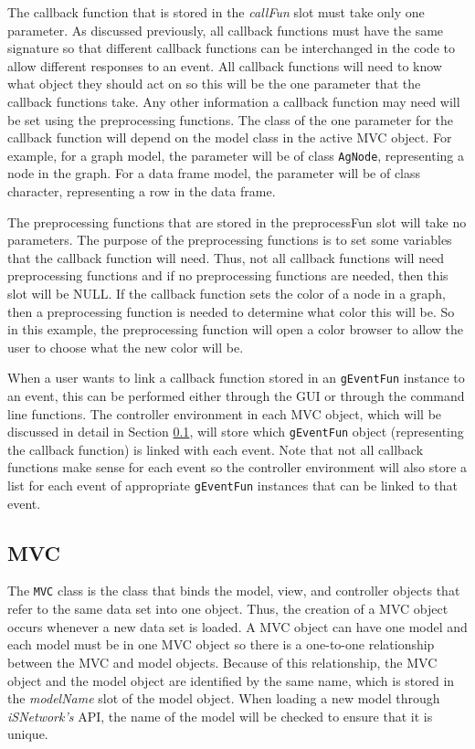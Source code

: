 \documentclass{article}[11pt]
\newcommand{\Robject}[1]{{\texttt{#1}}}
\newcommand{\Rpackage}[1]{{\textit{#1}}}
\newcommand{\Rslot}[1]{\textsl{#1}}
\begin{document}
The callback function that is stored in the \Rslot{callFun} slot must take
only one parameter.  As discussed previously, all callback functions must have
the same signature so that different callback functions can be interchanged in
the code to allow different responses to an event.  All callback functions
will need to know what object they should act on so this will be the one
parameter that the callback functions take.  Any other information a callback
function may need will be set using the preprocessing functions.  The class of
the one parameter for the callback function will depend on the model class in
the active MVC object.  For example, for a graph model, the parameter will be
of class \Robject{AgNode}, representing a node in the graph.  For a data frame
model, the parameter will be of class character, representing a row in the
data frame. 

The preprocessing functions that are stored in the preprocessFun slot will
take no parameters.  The purpose of the preprocessing functions is to set some
variables that the callback function will need.  Thus, not all callback
functions will need preprocessing functions and if no preprocessing functions
are needed, then this slot will be NULL.  If the callback function sets the
color of a node in a graph, then a preprocessing function is needed to
determine what color this will be.  So in this example, the preprocessing
function will open a color browser to allow the user to choose what the new
color will be.

When a user wants to link a callback function stored in an \Robject{gEventFun}
instance to an event, this can be performed either through the GUI or through
the command line functions.  The controller environment in each MVC object,
which will be discussed in detail in Section \ref{Ssec:OneMVC},
will store which \Robject{gEventFun} object (representing the callback
function) is linked with each event.  Note that not all callback functions
make sense for each event so the controller environment will also store a list
for each event of appropriate \Robject{gEventFun} instances that can be linked
to that event.

\subsection{MVC}\label{Ssec:OneMVC}
 
The \Robject{MVC} class is the class that binds the model, view, and
controller objects that refer to the same data set into one object.  Thus, the
creation of a MVC object occurs whenever a new data set is loaded.  A
MVC object can have one model and each model must be in one
MVC object so there is a one-to-one relationship between the
MVC and model objects.  Because of this relationship, the
MVC object and the model object are identified by the same name,
which is stored in the \Rslot{modelName} slot of the model object.  When
loading a new model through \Rpackage{iSNetwork's} API, the name of the model
will be checked to ensure that it is unique.
\end{document}
